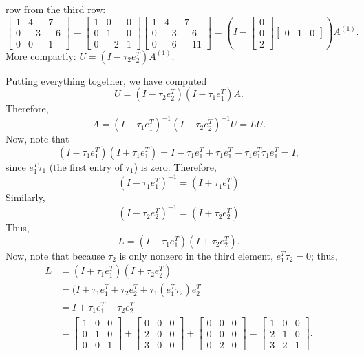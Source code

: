 \documentclass[12pt, leqno]{article}
\begin{document}
row from the third row:
\[
  \begin{bmatrix}
    1 &  4 &  7 \\
    0 & -3 & -6 \\
    0 &  0 &  1
  \end{bmatrix} =
  \begin{bmatrix}
    1 & 0 & 0 \\
    0 & 1 & 0 \\
    0 & -2 & 1
  \end{bmatrix}
  \begin{bmatrix}
    1 &  4 &  7 \\
    0 & -3 & -6 \\
    0 & -6 & -11
  \end{bmatrix} =
  \left( I - \begin{bmatrix} 0 \\ 0 \\ 2 \end{bmatrix}
             \begin{bmatrix} 0 & 1 & 0 \end{bmatrix} \right) A^{(1)}.
\]
More compactly: $U = (I-\tau_2 e_2^T) A^{(1)}$.

Putting everything together, we have computed
\[
  U = (I-\tau_2 e_2^T) (I-\tau_1 e_1^T) A.
\]
Therefore,
\[
  A = (I-\tau_1 e_1^T)^{-1} (I-\tau_2 e_2^T)^{-1} U = LU.
\]
Now, note that
\[
  (I-\tau_1 e_1^T) (I + \tau_1 e_1^T) =
  I - \tau_1 e_1^T + \tau_1 e_1^T - \tau_1 e_1^T \tau_1 e_1^T = I,
\]
since $e_1^T \tau_1$ (the first entry of $\tau_1$) is zero.  Therefore,
\[
  (I-\tau_1 e_1^T)^{-1} = (I+\tau_1 e_1^T)
\]
Similarly,
\[
  (I-\tau_2 e_2^T)^{-1} = (I+\tau_2 e_2^T)
\]
Thus,
\[
  L = (I+\tau_1 e_1^T)(I + \tau_2 e_2^T).
\]
Now, note that because $\tau_2$ is only nonzero in the third element,
$e_1^T \tau_2 = 0$; thus,
\begin{align*}
  L &= (I+\tau_1 e_1^T)(I + \tau_2 e_2^T) \\
    &= (I + \tau_1 e_1^T + \tau_2 e_2^T + \tau_1 (e_1^T \tau_2) e_2^T \\
    &= I + \tau_1 e_1^T + \tau_2 e_2^T \\
    &= \begin{bmatrix} 1 & 0 & 0 \\ 0 & 1 & 0 \\ 0 & 0 & 1 \end{bmatrix} +
       \begin{bmatrix} 0 & 0 & 0 \\ 2 & 0 & 0 \\ 3 & 0 & 0 \end{bmatrix} +
       \begin{bmatrix} 0 & 0 & 0 \\ 0 & 0 & 0 \\ 0 & 2 & 0 \end{bmatrix}
     = \begin{bmatrix} 1 & 0 & 0 \\ 2 & 1 & 0 \\ 3 & 2 & 1 \end{bmatrix}.
\end{align*}
\end{document}
